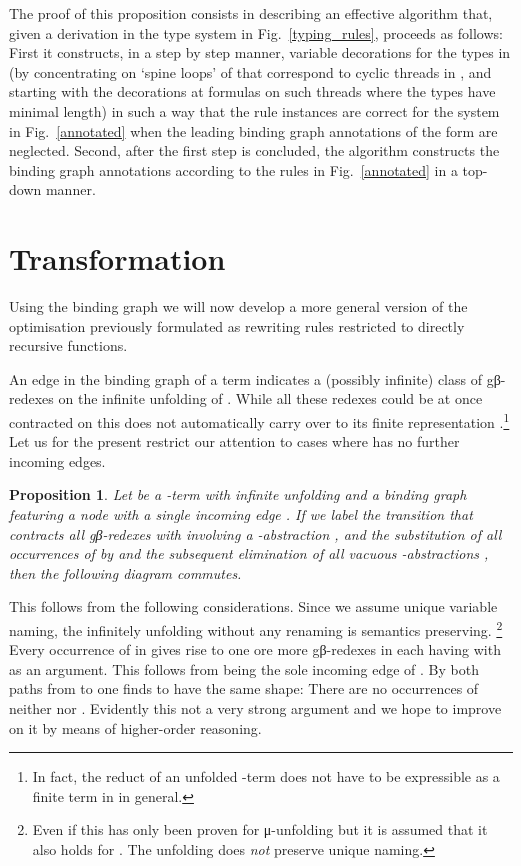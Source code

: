 \documentclass[submission,copyright,creativecommons]{eptcs}
\newtheorem{proposition}[theorem]{Proposition}
\renewcommand\;{\,}
\begin{document}
The proof of this proposition consists in describing an effective algorithm
that, given a derivation  in the type system in Fig.~\ref{typing_rules}, proceeds as follows:
First it constructs, in a step by step manner, variable decorations for the types in  
(by concentrating on `spine loops' of  that correspond to cyclic threads in ,
and starting with the decorations at formulas on such threads where the types have minimal length)
in such a way that the rule instances are correct for the system in Fig.~\ref{annotated}
when the leading binding graph annotations of the form  are neglected.
Second, after the first step is concluded, the algorithm constructs 
the binding graph annotations according to the rules in Fig.~\ref{annotated}
in a top-down manner.
 


\section{Transformation}
Using the binding graph we will now develop a more general version of the
optimisation previously formulated as rewriting rules restricted to directly
recursive functions.

An edge  in the binding graph of a term  indicates a (possibly
infinite) class of gβ-redexes on the infinite unfolding  of . While all
these redexes could be at once contracted on  this does not automatically
carry over to its finite representation .\footnote{In fact, the reduct of an
unfolded -term does not have to be expressible as a finite term
in  in general.} Let us for the present restrict our attention
to cases where  has no further incoming edges.

\begin{proposition}\normalfont
Let  be a -term with infinite unfolding  and a binding
graph featuring a node  with a {\it single incoming} edge .
If we label the transition that contracts all gβ-redexes with involving a
-abstraction , and the substitution of all occurrences of  by 
and the subsequent elimination of all vacuous -abstractions , then
the following diagram commutes.

\end{proposition}
This follows from the following considerations. Since we assume unique variable
naming, the infinitely unfolding  without any renaming is semantics
preserving. \cite{endr:grab:klop:oost:2010}\footnote{Even if this has only been
proven for μ-unfolding but it is assumed that it also holds for
. The unfolding does {\it not} preserve unique naming.} Every
occurrence of  in  gives rise to one ore more gβ-redexes in  each
having  with  as an argument. This follows from  being the
sole incoming edge of . By both paths from  to  one finds  to
have the same shape: There are no occurrences of neither  nor .
Evidently this not a very strong argument and we hope to improve on it by means
of higher-order reasoning.
\end{document}
